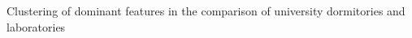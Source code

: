 Clustering of dominant features in the comparison of university dormitories and laboratories
\label{fig:featurecluserting_dormvslabs}